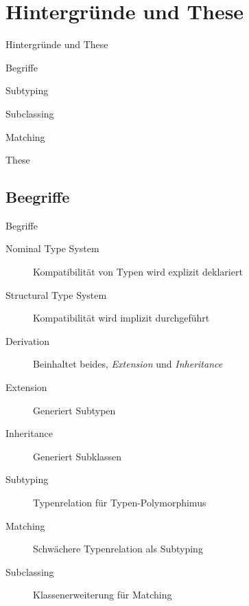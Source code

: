\section{Hintergründe und These}
\begin{frame}{Hintergründe und These}
	\begin{bigitemize}{3mm}
		\item Begriffe
		\item Subtyping
		\item Subclassing
		\item Matching
		\item These
	\end{bigitemize}
\end{frame}

\subsection{Beegriffe}
\begin{frame}{Begriffe}
	\begin{description}
		\item[Nominal Type System] Kompatibilität von Typen wird explizit deklariert
		\item[Structural Type System] Kompatibilität wird implizit durchgeführt
		\item[Derivation] Beinhaltet beides, \emph{Extension} und \emph{Inheritance}
		\item[Extension] Generiert Subtypen
		\item[Inheritance] Generiert Subklassen
		\item[Subtyping] Typenrelation für Typen-Polymorphimus
		\item[Matching] Schwächere Typenrelation als Subtyping
		\item[Subclassing] Klassenerweiterung für Matching
	\end{description}
\end{frame}

